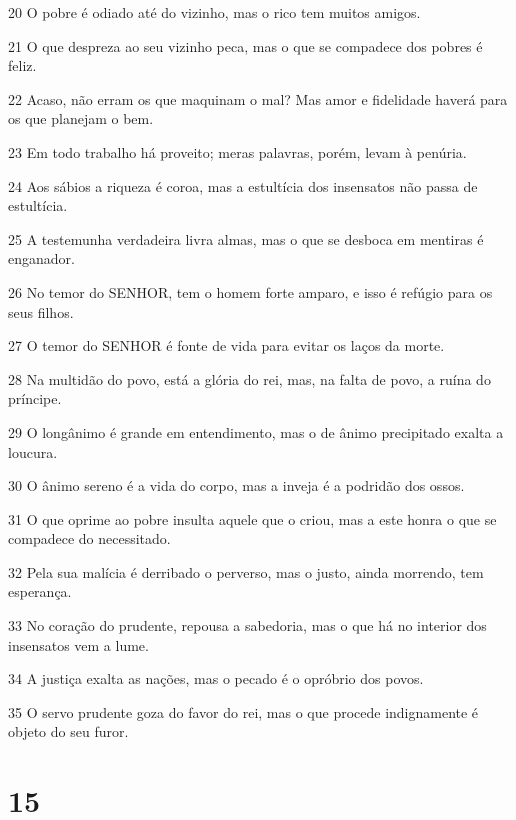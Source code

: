 \par 20 O pobre é odiado até do vizinho, mas o rico tem muitos amigos.
\par 21 O que despreza ao seu vizinho peca, mas o que se compadece dos pobres é feliz.
\par 22 Acaso, não erram os que maquinam o mal? Mas amor e fidelidade haverá para os que planejam o bem.
\par 23 Em todo trabalho há proveito; meras palavras, porém, levam à penúria.
\par 24 Aos sábios a riqueza é coroa, mas a estultícia dos insensatos não passa de estultícia.
\par 25 A testemunha verdadeira livra almas, mas o que se desboca em mentiras é enganador.
\par 26 No temor do SENHOR, tem o homem forte amparo, e isso é refúgio para os seus filhos.
\par 27 O temor do SENHOR é fonte de vida para evitar os laços da morte.
\par 28 Na multidão do povo, está a glória do rei, mas, na falta de povo, a ruína do príncipe.
\par 29 O longânimo é grande em entendimento, mas o de ânimo precipitado exalta a loucura.
\par 30 O ânimo sereno é a vida do corpo, mas a inveja é a podridão dos ossos.
\par 31 O que oprime ao pobre insulta aquele que o criou, mas a este honra o que se compadece do necessitado.
\par 32 Pela sua malícia é derribado o perverso, mas o justo, ainda morrendo, tem esperança.
\par 33 No coração do prudente, repousa a sabedoria, mas o que há no interior dos insensatos vem a lume.
\par 34 A justiça exalta as nações, mas o pecado é o opróbrio dos povos.
\par 35 O servo prudente goza do favor do rei, mas o que procede indignamente é objeto do seu furor.

\chapter{15}

